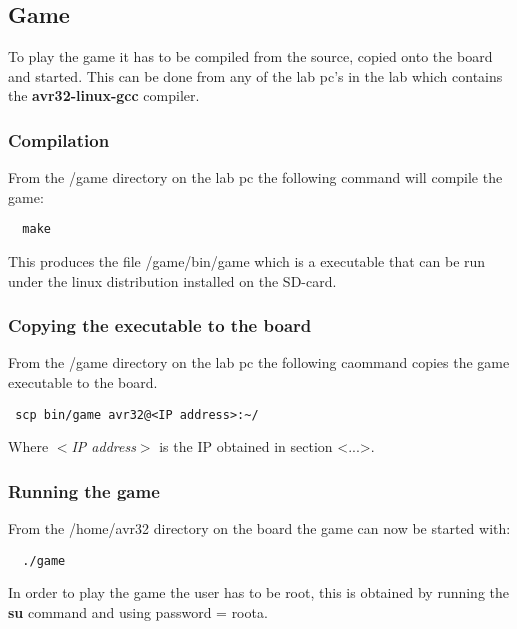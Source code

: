 \subsection{Game}

To play the game it has to be compiled from the source, copied onto the board and started.
This can be done from any of the lab pc's in the lab which contains the {\bf avr32-linux-gcc} compiler.

\subsubsection{Compilation}
From the /game directory on the lab pc the following command will compile the game:
\begin{verbatim}
  make
\end{verbatim}

This produces the file /game/bin/game which is a executable that can be run under the linux distribution
installed on the SD-card.

\subsubsection{Copying the executable to the board}
From the /game directory on the lab pc the following caommand copies the game executable to the board.
\begin{verbatim}
 scp bin/game avr32@<IP address>:~/
\end{verbatim}
Where {\it $<$IP address$>$} is the IP obtained in section <...>.

\subsubsection{Running the game}
From the /home/avr32 directory on the board the game can now be started with:
\begin{verbatim}
  ./game
\end{verbatim}

In order to play the game the user has to be root, this is obtained by running the {\bf su} command
and using password = roota.
